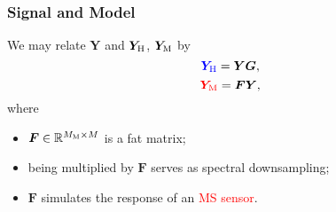 \documentclass[10pt,mathserif]{beamer}
\newcommand{\R}{\mathbb R}
\begin{document}
    \begin{frame}
        \frametitle{Signal and Model}
        We may relate $\bm Y$ and $\bm Y_\text H$, $\bm Y_\text M$ by
        \[ \textcolor{blue}{\bm Y_\text H} = \bm Y \bm G, \]
        \[ \textcolor{red}{\bm Y_\text M}  = \bm F \bm Y, \]
        where
        \begin{itemize}
            \item $\bm F \in \R^{M_\text M \times M}$ is a fat matrix;
            \item being multiplied by $\bm F$ serves as spectral downsampling;
            \item $\bm F$ simulates the response of an \textcolor{red}{MS sensor}.
        \end{itemize}
    \end{frame}
\end{document}
